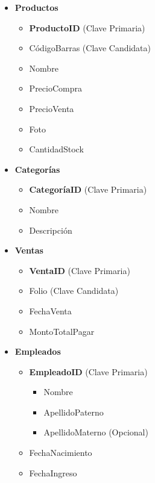 \documentclass[10pt,openany]{book}
\begin{document}
\begin{itemize}
    \item \textbf{Productos}
        \begin{itemize}
            \item \textbf{ProductoID} (Clave Primaria)
            \item CódigoBarras (Clave Candidata)
            \item Nombre
            \item PrecioCompra
            \item PrecioVenta
            \item Foto
            \item CantidadStock
        \end{itemize}
        
    \item \textbf{Categorías}
        \begin{itemize}
            \item \textbf{CategoríaID} (Clave Primaria)
            \item Nombre
            \item Descripción
        \end{itemize}
        
    \item \textbf{Ventas}
        \begin{itemize}
            \item \textbf{VentaID} (Clave Primaria)
            \item Folio (Clave Candidata)
            \item FechaVenta
            \item MontoTotalPagar
        \end{itemize}
        
    \item \textbf{Empleados}
        \begin{itemize}
            \item \textbf{EmpleadoID} (Clave Primaria)
            \begin{itemize}
                \item Nombre
                \item ApellidoPaterno
                \item ApellidoMaterno (Opcional)
            \end{itemize}
            \item FechaNacimiento
            \item FechaIngreso
        \end{itemize}
        

\end{itemize}
\end{document}
